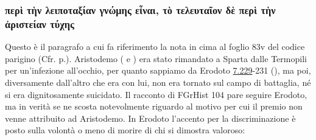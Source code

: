 {    \subsubsection{\textgreek{περὶ τὴν λειποταξίαν γνώμης εἶναι, τὸ τελευταῖον δὲ περὶ τὴν ἀριστείαν τύχης}}
    \label{bkm:RefHeading690041501267828}
    Questo è il paragrafo a cui fa riferimento la nota in cima al foglio 83v del codice parigino (Cfr. p.\pageref{aristodemoincodparsupplgr607}). Aristodemo (\cite[187-91]{Lombardo2005} e \cite[62]{Dewald2011}) era stato rimandato a Sparta dalle Termopili per un'infezione all'occhio, per quanto sappiamo da Erodoto \href{http://data.perseus.org/citations/urn:cts:greekLit:tlg0016.tlg001.perseus-grc1:7.229}{7.229}-231 (\cite[75]{Clarke2002}), ma poi, diversamente dall'altro che era con lui, non era tornato sul campo di battaglia, né si era dignitosamente suicidato. Il racconto di FGrHist 104 pare seguire Erodoto, ma in verità se ne scosta notevolmente riguardo al motivo per cui il premio non venne attribuito ad Aristodemo. In Erodoto l'accento per la discriminazione è posto sulla volontà o meno di morire di chi si dimostra valoroso: 
}
